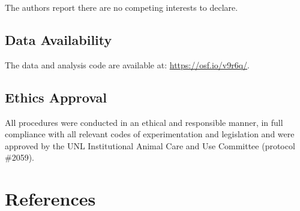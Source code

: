 \documentclass[
  pub]{apa6}
\begin{document}
The authors report there are no competing interests to declare.

\hypertarget{data-availability}{%
\subsection{Data Availability}\label{data-availability}}

The data and analysis code are available at: \url{https://osf.io/v9r6q/}.

\hypertarget{ethics-approval}{%
\subsection{Ethics Approval}\label{ethics-approval}}

All procedures were conducted in an ethical and responsible manner, in full compliance with all relevant codes of experimentation and legislation and were approved by the UNL Institutional Animal Care and Use Committee (protocol \#2059).

\hypertarget{references}{%
\section{References}\label{references}}

\scriptsize
\end{document}
